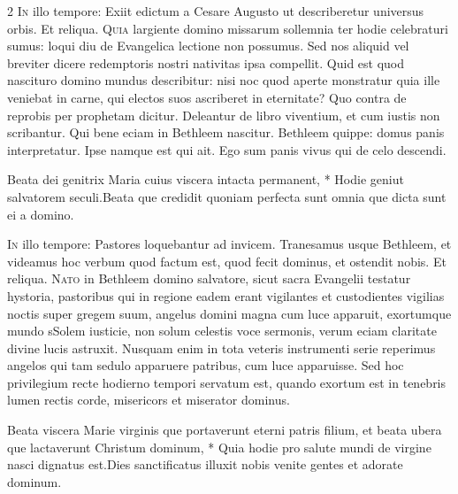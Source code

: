 \begin{multicols*}{2}
\lettrine[lines=2]{\zallmancaps \color{Blue} I}{n} illo tempore: Exiit edictum a Cesare Augusto ut describeretur universus orbis. Et reliqua.
\lettrine[lines=2]{\zallmancaps \color{Red} Q}{uia} largiente domino missarum sollemnia ter hodie celebraturi sumus: loqui diu de Evangelica lectione non possumus. Sed nos aliquid vel breviter dicere redemptoris nostri nativitas ipsa compellit. Quid est quod nascituro domino mundus describitur: nisi noc quod aperte monstratur quia ille veniebat in carne, qui electos suos ascriberet in eternitate? Quo contra de reprobis per prophetam dicitur. Deleantur de libro viventium, et cum iustis non scribantur. Qui bene eciam in Bethleem nascitur. Bethleem quippe: domus panis interpretatur. Ipse namque est qui ait. Ego sum panis vivus qui de celo descendi.
\begin{responsory}
{Beata dei genitrix Maria cuius viscera intacta permanent, * Hodie geniut salvatorem seculi.}{Beata que credidit quoniam perfecta sunt omnia que dicta sunt ei a domino.}
\end{responsory}%
\lettrine[lines=2]{\zallmancaps \color{Blue} I}{n} illo tempore: Pastores loquebantur ad invicem. Tranesamus usque Bethleem, et videamus hoc verbum quod factum est, quod fecit dominus, et ostendit nobis. Et reliqua.
\lettrine[lines=2]{\zallmancaps \color{Red} N}{ato} in Bethleem domino salvatore, sicut sacra Evangelii testatur hystoria, pastoribus qui in regione eadem erant vigilantes et custodientes vigilias noctis super gregem suum, angelus domini magna cum luce apparuit, exortumque mundo sSolem iusticie, non solum celestis voce sermonis, verum eciam claritate divine lucis astruxit. Nusquam enim in tota veteris instrumenti serie reperimus angelos qui tam sedulo apparuere patribus, cum luce apparuisse. Sed hoc privilegium recte hodierno tempori servatum est, quando exortum est in tenebris lumen rectis corde, misericors et miserator dominus.
\begin{responsory}
{Beata viscera Marie virginis que portaverunt eterni patris filium, et beata ubera que lactaverunt Christum dominum, * Quia hodie pro salute mundi de virgine nasci dignatus est.}{Dies sanctificatus illuxit nobis venite gentes et adorate dominum.}

\end{responsory}
\end{multicols*}
